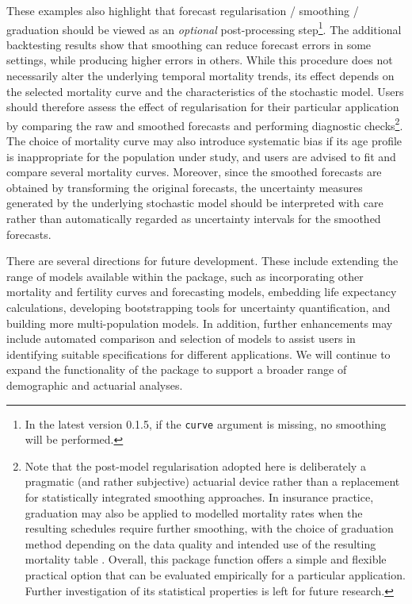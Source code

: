 These examples also highlight that forecast regularisation / smoothing / graduation should be viewed as an \emph{optional} post-processing step\footnote{In the latest  version 0.1.5, if the \texttt{curve} argument is missing, no smoothing will be performed.}. The additional backtesting results show that smoothing can reduce forecast errors in some settings, while producing higher errors in others. While this procedure does not necessarily alter the underlying temporal mortality trends, its effect depends on the selected mortality curve and the characteristics of the stochastic model. Users should therefore assess the effect of regularisation for their particular application by comparing the raw and smoothed forecasts and performing diagnostic checks\footnote{Note that the post-model regularisation adopted here is deliberately a pragmatic (and rather subjective) actuarial device rather than a replacement for statistically integrated smoothing approaches. In insurance practice, graduation may also be applied to modelled mortality rates when the resulting schedules require further smoothing, with the choice of graduation method depending on the data quality and intended use of the resulting mortality table \citep{Atkinson2018}. Overall, this package function offers a simple and flexible practical option that can be evaluated empirically for a particular application. Further investigation of its statistical properties is left for future research.}. The choice of mortality curve may also introduce systematic bias if its age profile is inappropriate for the population under study, and users are advised to fit and compare several mortality curves. Moreover, since the smoothed forecasts are obtained by transforming the original forecasts, the uncertainty measures generated by the underlying stochastic model should be interpreted with care rather than automatically regarded as uncertainty intervals for the smoothed forecasts.

There are several directions for future development. These include extending the range of models available within the package, such as incorporating other mortality and fertility curves and forecasting models, embedding life expectancy calculations, developing bootstrapping tools for uncertainty quantification, and building more multi-population models. In addition, further enhancements may include automated comparison and selection of models to assist users in identifying suitable specifications for different applications. We will continue to expand the functionality of the package to support a broader range of demographic and actuarial analyses.

